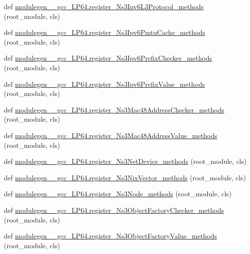 \begin{DoxyCompactItemize}
\item 
def \hyperlink{namespacemodulegen____gcc__LP64_aa137dded43f9daede5e645c4d1014074}{modulegen\+\_\+\+\_\+gcc\+\_\+\+L\+P64.\+register\+\_\+\+Ns3\+Ipv6\+L3\+Protocol\+\_\+methods} (root\+\_\+module, cls)
\item 
def \hyperlink{namespacemodulegen____gcc__LP64_ac1c7fb639fdb701927ab23f69ebde641}{modulegen\+\_\+\+\_\+gcc\+\_\+\+L\+P64.\+register\+\_\+\+Ns3\+Ipv6\+Pmtu\+Cache\+\_\+methods} (root\+\_\+module, cls)
\item 
def \hyperlink{namespacemodulegen____gcc__LP64_ab45b7cad858b5fb8fd4921640270716f}{modulegen\+\_\+\+\_\+gcc\+\_\+\+L\+P64.\+register\+\_\+\+Ns3\+Ipv6\+Prefix\+Checker\+\_\+methods} (root\+\_\+module, cls)
\item 
def \hyperlink{namespacemodulegen____gcc__LP64_a24017f7931b685270f9f9cae9dbc1f2e}{modulegen\+\_\+\+\_\+gcc\+\_\+\+L\+P64.\+register\+\_\+\+Ns3\+Ipv6\+Prefix\+Value\+\_\+methods} (root\+\_\+module, cls)
\item 
def \hyperlink{namespacemodulegen____gcc__LP64_a8b5d96f51d4bdc5d94489bcc0a50e648}{modulegen\+\_\+\+\_\+gcc\+\_\+\+L\+P64.\+register\+\_\+\+Ns3\+Mac48\+Address\+Checker\+\_\+methods} (root\+\_\+module, cls)
\item 
def \hyperlink{namespacemodulegen____gcc__LP64_aa62ae7526abc00b083df3d90589e2e92}{modulegen\+\_\+\+\_\+gcc\+\_\+\+L\+P64.\+register\+\_\+\+Ns3\+Mac48\+Address\+Value\+\_\+methods} (root\+\_\+module, cls)
\item 
def \hyperlink{namespacemodulegen____gcc__LP64_a2518a92fbd97a7666c5b4897eeb07c34}{modulegen\+\_\+\+\_\+gcc\+\_\+\+L\+P64.\+register\+\_\+\+Ns3\+Net\+Device\+\_\+methods} (root\+\_\+module, cls)
\item 
def \hyperlink{namespacemodulegen____gcc__LP64_a5cca2624411c350fed578acdd9616437}{modulegen\+\_\+\+\_\+gcc\+\_\+\+L\+P64.\+register\+\_\+\+Ns3\+Nix\+Vector\+\_\+methods} (root\+\_\+module, cls)
\item 
def \hyperlink{namespacemodulegen____gcc__LP64_a158d48a8db192c306a8eff9ae0b0503a}{modulegen\+\_\+\+\_\+gcc\+\_\+\+L\+P64.\+register\+\_\+\+Ns3\+Node\+\_\+methods} (root\+\_\+module, cls)
\item 
def \hyperlink{namespacemodulegen____gcc__LP64_a4f37eb35629332dd2318799b3efe197e}{modulegen\+\_\+\+\_\+gcc\+\_\+\+L\+P64.\+register\+\_\+\+Ns3\+Object\+Factory\+Checker\+\_\+methods} (root\+\_\+module, cls)
\item 
def \hyperlink{namespacemodulegen____gcc__LP64_aa08b54c074e688b2a88a54ada11db8fc}{modulegen\+\_\+\+\_\+gcc\+\_\+\+L\+P64.\+register\+\_\+\+Ns3\+Object\+Factory\+Value\+\_\+methods} (root\+\_\+module, cls)

\end{DoxyCompactItemize}
